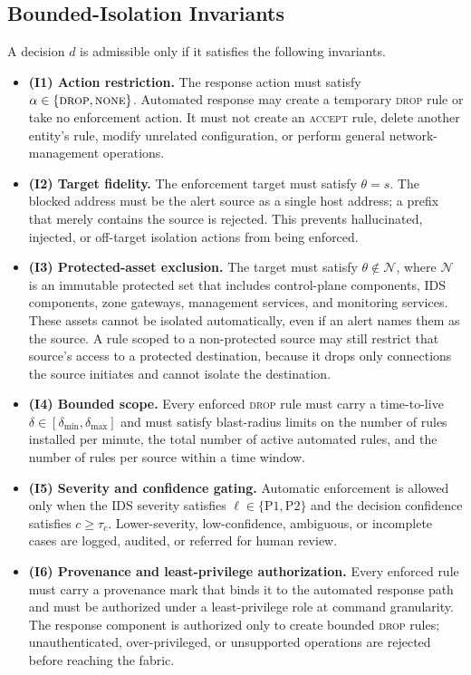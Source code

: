 \documentclass[final,5p]{elsarticle}
\begin{document}
\subsection{Bounded-Isolation Invariants}
\label{sec:invariants}

A decision $d$ is admissible only if it satisfies the following invariants.

\begin{itemize}
    \item \textbf{(I1) Action restriction.} The response action must satisfy $\alpha \in \{\textsc{drop},\textsc{none}\}$. Automated response may create a temporary \textsc{drop} rule or take no enforcement action. It must not create an \textsc{accept} rule, delete another entity's rule, modify unrelated configuration, or perform general network-management operations.

    \item \textbf{(I2) Target fidelity.} The enforcement target must satisfy $\theta=s$. The blocked address must be the alert source as a single host address; a prefix that merely contains the source is rejected. This prevents hallucinated, injected, or off-target isolation actions from being enforced.

    \item \textbf{(I3) Protected-asset exclusion.} The target must satisfy $\theta \notin \mathcal{N}$, where $\mathcal{N}$ is an immutable protected set that includes control-plane components, IDS components, zone gateways, management services, and monitoring services. These assets cannot be isolated automatically, even if an alert names them as the source. A rule scoped to a non-protected source may still restrict that source's access to a protected destination, because it drops only connections the source initiates and cannot isolate the destination.

    \item \textbf{(I4) Bounded scope.} Every enforced \textsc{drop} rule must carry a time-to-live $\delta \in [\delta_{\min},\delta_{\max}]$ and must satisfy blast-radius limits on the number of rules installed per minute, the total number of active automated rules, and the number of rules per source within a time window.

    \item \textbf{(I5) Severity and confidence gating.} Automatic enforcement is allowed only when the IDS severity satisfies $\ell \in \{\text{P1},\text{P2}\}$ and the decision confidence satisfies $c\geq\tau_c$. Lower-severity, low-confidence, ambiguous, or incomplete cases are logged, audited, or referred for human review.

    \item \textbf{(I6) Provenance and least-privilege authorization.} Every enforced rule must carry a provenance mark that binds it to the automated response path and must be authorized under a least-privilege role at command granularity. The response component is authorized only to create bounded \textsc{drop} rules; unauthenticated, over-privileged, or unsupported operations are rejected before reaching the fabric.
\end{itemize}
\end{document}
